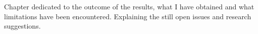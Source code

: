 Chapter dedicated to the outcome of the results, what I have obtained and what limitations have been encountered.
Explaining the still open issues and research suggestions.